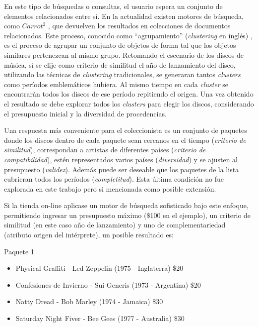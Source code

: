 En este tipo de búsquedas o consultas, el usuario espera un conjunto de elementos relacionados entre sí. En la actualidad existen motores de búsqueda, como $Carrot^{2}$ \cite{url:carrot}, que devuelven los resultados en colecciones de documentos relacionados. Este proceso, conocido como ``agrupamiento'' (\textit{clustering} en inglés) \cite{wiki:clustering}, es el proceso de agrupar un conjunto de objetos de forma tal que los objetos similares pertenezcan al mismo grupo. Retomando el escenario de los discos de música, sí se elije como criterio de similitud el año de lanzamiento del disco, utilizando las técnicas de {\em clustering} tradicionales, se generaran tantos {\em clusters} como períodos emblemáticos hubiera. Al mismo tiempo en cada {\em cluster} se encontrarán todos los discos de ese período repitiendo el origen. Una vez obtenido el resultado se debe explorar todos los {\em clusters} para elegir los discos, considerando el presupuesto inicial y la diversidad de procedencias.

Una respuesta más conveniente para el coleccionista es un conjunto de paquetes donde los discos dentro de cada paquete sean cercanos en el tiempo ({\em criterio de similitud}), correspondan a artistas de diferentes países ({\em criterio de compatibilidad}), estén representados varios países ({\em diversidad}) y se ajusten al presupuesto ({\em validez}). Además puede ser deseable que los paquetes de la lista cubrieran todos los períodos ({\em completitud}). Esta última condición no fue explorada en este trabajo pero si mencionada como posible extensión.

Si la tienda on-line aplicase un motor de búsqueda sofisticado bajo este enfoque, permitiendo ingresar un presupuesto máximo (\$100 en el ejemplo), un criterio de similitud (en este caso año de lanzamiento) y uno de complementariedad (atributo origen del intérprete), un posible resultado es:

\begin{mybox}{Paquete 1}
	\begin{itemize}
		\item {\scriptsize Physical Graffiti - Led Zeppelin (1975 - Inglaterra) \$20}
		\item {\scriptsize Confesiones de Invierno - Sui Generis (1973 - Argentina) \$20}
		\item {\scriptsize Natty Dread - Bob Marley (1974 - Jamaica) \$30}
		\item {\scriptsize Saturday Night Fiver - Bee Gees (1977 - Australia) \$30}
	\end{itemize}
\end{mybox}

